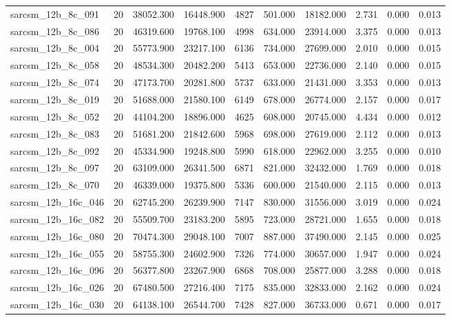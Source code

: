 \begin{tabular}{lrrrrrrrrr}
sarcsm\_12b\_8c\_091 & 20 & 38052.300 & 16448.900 & 4827 & 501.000 & 18182.000 & 2.731 & 0.000 & 0.013 \\
sarcsm\_12b\_8c\_086 & 20 & 46319.600 & 19768.100 & 4998 & 634.000 & 23914.000 & 3.375 & 0.000 & 0.013 \\
sarcsm\_12b\_8c\_004 & 20 & 55773.900 & 23217.100 & 6136 & 734.000 & 27699.000 & 2.010 & 0.000 & 0.015 \\
sarcsm\_12b\_8c\_058 & 20 & 48534.300 & 20482.200 & 5413 & 653.000 & 22736.000 & 2.140 & 0.000 & 0.015 \\
sarcsm\_12b\_8c\_074 & 20 & 47173.700 & 20281.800 & 5737 & 633.000 & 21431.000 & 3.353 & 0.000 & 0.013 \\
sarcsm\_12b\_8c\_019 & 20 & 51688.000 & 21580.100 & 6149 & 678.000 & 26774.000 & 2.157 & 0.000 & 0.017 \\
sarcsm\_12b\_8c\_052 & 20 & 44104.200 & 18896.000 & 4625 & 608.000 & 20745.000 & 4.434 & 0.000 & 0.012 \\
sarcsm\_12b\_8c\_083 & 20 & 51681.200 & 21842.600 & 5968 & 698.000 & 27619.000 & 2.112 & 0.000 & 0.013 \\
sarcsm\_12b\_8c\_092 & 20 & 45334.900 & 19248.800 & 5990 & 618.000 & 22962.000 & 3.255 & 0.000 & 0.010 \\
sarcsm\_12b\_8c\_097 & 20 & 63109.000 & 26341.500 & 6871 & 821.000 & 32432.000 & 1.769 & 0.000 & 0.018 \\
sarcsm\_12b\_8c\_070 & 20 & 46339.000 & 19375.800 & 5336 & 600.000 & 21540.000 & 2.115 & 0.000 & 0.013 \\
sarcsm\_12b\_16c\_046 & 20 & 62745.200 & 26239.900 & 7147 & 830.000 & 31556.000 & 3.019 & 0.000 & 0.024 \\
sarcsm\_12b\_16c\_082 & 20 & 55509.700 & 23183.200 & 5895 & 723.000 & 28721.000 & 1.655 & 0.000 & 0.018 \\
sarcsm\_12b\_16c\_080 & 20 & 70474.300 & 29048.100 & 7007 & 887.000 & 37490.000 & 2.145 & 0.000 & 0.025 \\
sarcsm\_12b\_16c\_055 & 20 & 58755.300 & 24602.900 & 7326 & 774.000 & 30657.000 & 1.947 & 0.000 & 0.024 \\
sarcsm\_12b\_16c\_096 & 20 & 56377.800 & 23267.900 & 6868 & 708.000 & 25877.000 & 3.288 & 0.000 & 0.018 \\
sarcsm\_12b\_16c\_026 & 20 & 67480.500 & 27216.400 & 7175 & 835.000 & 32833.000 & 2.162 & 0.000 & 0.024 \\
sarcsm\_12b\_16c\_030 & 20 & 64138.100 & 26544.700 & 7428 & 827.000 & 36733.000 & 0.671 & 0.000 & 0.017 \\

\end{tabular}
